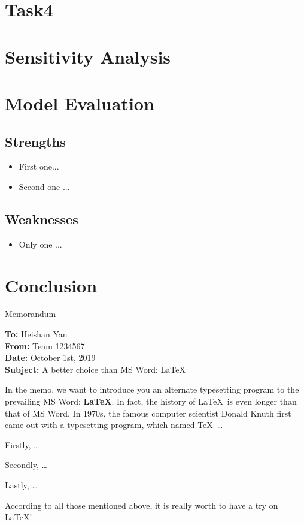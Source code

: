 \documentclass[12pt]{article}  %
\begin{document}
\section{Task4}

\section{Sensitivity Analysis}

\section{Model Evaluation}
\subsection{Strengths}
\begin{itemize}
    \item First one...
    \item Second one ...
\end{itemize}

\subsection{Weaknesses}
\begin{itemize}
    \item Only one ...
 \end{itemize}
 
\section{Conclusion}

\begin{letter}{Memorandum}
\begin{flushleft}  %
\textbf{To:} Heishan Yan\\
\textbf{From:} Team 1234567\\
\textbf{Date:} October 1st, 2019\\
\textbf{Subject:} A better choice than MS Word: \LaTeX
\end{flushleft}

In the memo, we want to introduce you an alternate typesetting program to the prevailing MS Word: \textbf{\LaTeX}. In fact, the history of \LaTeX\ is even longer than that of MS Word. In 1970s, the famous computer scientist Donald Knuth first came out with a typesetting program, which named \TeX\ \ldots

Firstly, \ldots

Secondly, \ldots

Lastly, \ldots

According to all those mentioned above, it is really worth to have a try on \LaTeX! 
\end{letter}
\end{document}
